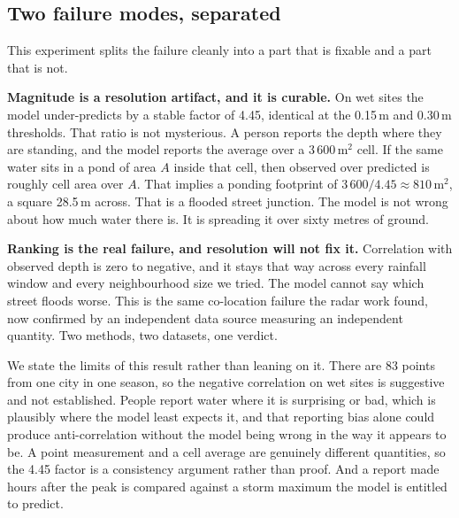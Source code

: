 \subsection{Two failure modes, separated}
This experiment splits the failure cleanly into a part that is fixable and a part that is not.

\textbf{Magnitude is a resolution artifact, and it is curable.} On wet sites the model
under-predicts by a stable factor of 4.45, identical at the 0.15\,m and 0.30\,m thresholds. That
ratio is not mysterious. A person reports the depth where they are standing, and the model reports
the average over a 3\,600\,m$^2$ cell. If the same water sits in a pond of area $A$ inside that
cell, then observed over predicted is roughly cell area over $A$. That implies a ponding footprint
of $3\,600 / 4.45 \approx 810$\,m$^2$, a square 28.5\,m across. That is a flooded street junction.
The model is not wrong about how much water there is. It is spreading it over sixty metres of
ground.

\textbf{Ranking is the real failure, and resolution will not fix it.} Correlation with observed
depth is zero to negative, and it stays that way across every rainfall window and every
neighbourhood size we tried. The model cannot say which street floods worse. This is the same
co-location failure the radar work found, now confirmed by an independent data source measuring an
independent quantity. Two methods, two datasets, one verdict.

We state the limits of this result rather than leaning on it. There are 83 points from one city in
one season, so the negative correlation on wet sites is suggestive and not established. People
report water where it is surprising or bad, which is plausibly where the model least expects it,
and that reporting bias alone could produce anti-correlation without the model being wrong in the
way it appears to be. A point measurement and a cell average are genuinely different quantities,
so the 4.45 factor is a consistency argument rather than proof. And a report made hours after the
peak is compared against a storm maximum the model is entitled to predict.
